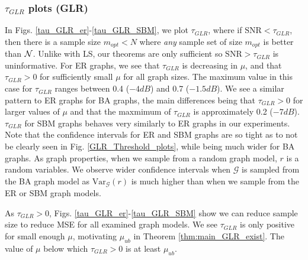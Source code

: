 \subsubsection{$\tau_{GLR}$ plots (GLR)}
In Figs. \ref{tau_GLR_er}-\ref{tau_GLR_SBM}, we plot $\tau_{GLR}$, where if $\textrm{SNR} < \tau_{GLR}$, then there is a sample size $m_{opt} < N$ where \emph{any} sample set of size $m_{opt}$ is better than $\mathcal{N}$. Unlike with LS, our theorems are only sufficient so $\text{SNR} > \tau_{GLR}$ is uninformative. %
    For ER graphs, we see that $\tau_{GLR}$ is decreasing in $\mu$, and that $\tau_{GLR} > 0$ for sufficiently small $\mu$ for all graph sizes. The maximum value in this case for $\tau_{GLR}$ ranges between 0.4 ($-4dB$) and 0.7 ($-1.5dB$). %
    We see a similar pattern to ER graphs for BA graphs, the main differences being that $\tau_{GLR} > 0$ for larger values of $\mu$ and that the maxmimum of $\tau_{GLR}$ is  approximately {\color{black}0.2 ($-7dB$)}.
    $\tau_{GLR}$ for SBM graphs behaves very similarly to ER graphs in our experiments.
Note that the confidence intervals for ER and SBM graphs are so tight as to not be clearly seen in Fig. \ref{GLR_Threshold_plots}, while being much wider for BA graphs. As  graph properties, when we sample from a random graph model, $r$ is a random variables. We observe wider confidence intervals {\color{black}when $\mathcal{G}$ is sampled from the BA graph model as $\text{Var}_{\mathcal{G}}(r)$ is much higher than when we sample from the ER or SBM graph models.}

As $\tau_{GLR} > 0$, Figs. \ref{tau_GLR_er}-\ref{tau_GLR_SBM} show we can reduce sample size to reduce MSE for all examined graph models. We see $\tau_{GLR}$ is only positive for small enough $\mu$, motivating $\mu_{ub}$ in Theorem \ref{thm:main_GLR_exist}. The value of $\mu$ below which $\tau_{GLR} > 0$ is at least $\mu_{ub}$.


